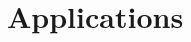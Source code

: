 \documentclass[main.tex]{subfiles}
\begin{document}
\section{Applications}
\label{sec:applications}
\end{document}
